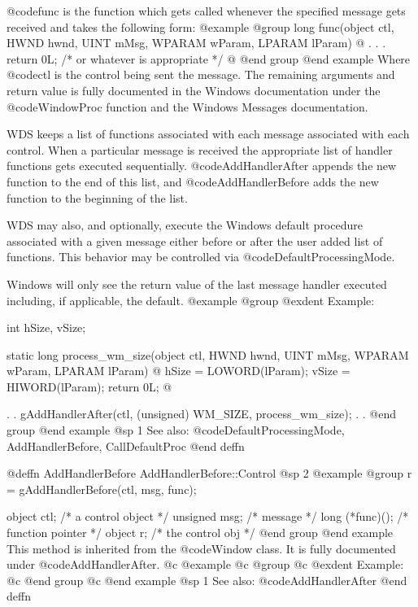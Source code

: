 @code{func} is the function which gets called whenever the specified
message gets received and takes the following form:
@example
@group
long    func(object     ctl,
             HWND       hwnd, 
             UINT       mMsg, 
             WPARAM     wParam, 
             LPARAM     lParam)
@{
        .
        .
        .
        return 0L;  /* or whatever is appropriate  */
@}
@end group
@end example
Where @code{ctl} is the control being sent the message.  The remaining
arguments and return value is fully documented in the Windows documentation
under the @code{WindowProc} function and the Windows Messages documentation.

WDS keeps a list of functions associated with each message associated
with each control.  When a particular message is received the appropriate
list of handler functions gets executed sequentially.
@code{AddHandlerAfter} appends the new function to the end of this list,
and @code{AddHandlerBefore} adds the new function to the beginning of
the list.

WDS may also, and optionally, execute the Windows default procedure
associated with a given message either before or after the user added
list of functions.  This behavior may be controlled via
@code{DefaultProcessingMode}.

Windows will only see the return value of the last message handler executed
including, if applicable, the default.
@example
@group
@exdent Example:

int     hSize, vSize;

static  long    process_wm_size(object  ctl, 
                                HWND    hwnd, 
                                UINT    mMsg, 
                                WPARAM  wParam, 
                                LPARAM  lParam)
@{
        hSize = LOWORD(lParam);
        vSize = HIWORD(lParam);
        return 0L;
@}

        .
        .
        gAddHandlerAfter(ctl, (unsigned) WM_SIZE, process_wm_size);
        .
        .
@end group
@end example
@sp 1
See also:  @code{DefaultProcessingMode, AddHandlerBefore, CallDefaultProc}
@end deffn






@deffn {AddHandlerBefore} AddHandlerBefore::Control
@sp 2
@example
@group
r = gAddHandlerBefore(ctl, msg, func);

object   ctl;      /*  a control object  */
unsigned msg;      /*  message           */
long    (*func)(); /*  function pointer  */
object  r;         /*  the control obj   */
@end group
@end example
This method is inherited from the @code{Window} class.
It is fully documented under @code{AddHandlerAfter}.
@c @example
@c @group
@c @exdent Example:
@c @end group
@c @end example
@sp 1
See also:  @code{AddHandlerAfter}
@end deffn









